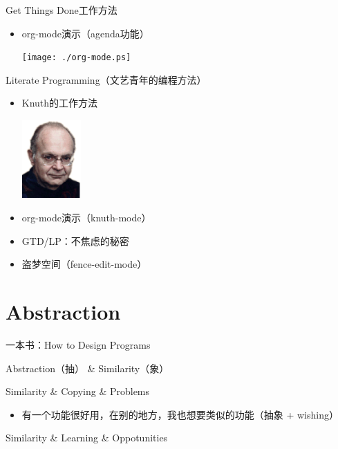 \documentclass[presentation,dvipdfmx,CJKbookmarks]{beamer}
\begin{document}
\begin{CJK*}{UTF8}{simsun}
\begin{frame}[label={sec:org5c278ab}]{Get Things Done\thinspace 工作方法}
\begin{itemize}[<+->]
\item org-mode\thinspace 演示（agenda\thinspace 功能）

\begin{center}
\texttt{[image: ./org-mode.ps]}
\end{center}
\end{itemize}
\end{frame}

\begin{frame}[label={sec:org53ebbb7}]{Literate Programming（文艺青年的编程方法）}
\begin{itemize}[<+->]
\item Knuth\thinspace 的工作方法

\begin{center}
\includegraphics[height=3cm]{./knuth.ps}
\end{center}

\item org-mode\thinspace 演示（knuth-mode）
\item GTD/LP：不焦虑的秘密
\item 盗梦空间（fence-edit-mode）
\end{itemize}
\end{frame}

\section{Abstraction}
\label{sec:orgae3065e}

\begin{frame}[label={sec:org464e192}]{一本书：How to Design Programs}
\pause
\begin{block}{Abstraction（抽） \& Similarity（象）}
\pause
\end{block}
\begin{block}{Similarity \& Copying \& Problems}
\pause
\begin{itemize}
\item 有一个功能很好用，在别的地方，我也想要类似的功能（抽象 + wishing）
\end{itemize}
\pause
\end{block}
\begin{block}{Similarity \& Learning \& Oppotunities}
\end{block}
\end{frame}


\end{CJK*}
\end{document}
